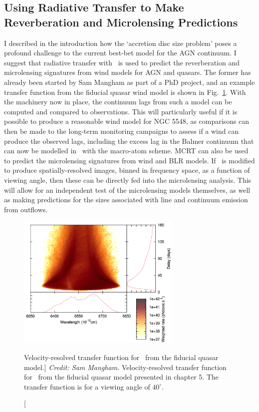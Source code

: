 \subsection{Using Radiative Transfer to Make Reverberation and Microlensing Predictions}

I described in the introduction how the `accretion disc size problem' poses
a profound challenge to the current best-bet model for the AGN continuum.
I suggest that radiative transfer with \py\ is used to predict the 
reverberation and microlensing signatures from wind models for AGN and quasars. 
The former has already been started by Sam Mangham as part of a PhD
project, and an example transfer function from the fiducial quasar wind model
is shown in Fig.~\ref{fig:halpha_transfer}. With the machinery now in place,
the continuum lags from such a model can be computed and compared to observations.
This will particularly useful if it is possible to produce a reasonable wind
model for NGC 5548, as comparisons can then be made to the long-term monitoring
campaigns \citep[e.g.][]{edelson2015} to assess if a wind can produce the observed 
lags, including the excess lag in the Balmer continuum that can now be modelled 
in \py\ with the macro-atom scheme. MCRT can also be used to predict 
the microlensing signatures from wind and BLR models. If \py\ is modified to produce
spatially-resolved images, binned in frequency space, as a function of viewing 
angle, then these can be directly fed into the microlensing analysis. This will
allow for an independent test of the microlensing models themselves, as well as
making predictions for the sizes associated with line and continuum emission from
outflows. 

\begin{figure} 
\centering
\includegraphics[width=0.7\textwidth]{figures/ewpaper/halpha_transfer.png}
\caption
[Velocity-resolved transfer function for \ha\ 
from the fiducial quasar model.]
{
{\sl Credit: Sam Mangham.}
Velocity-resolved transfer function for \ha\ 
from the fiducial quasar model presented in
chapter 5. The transfer function is for a viewing angle of 
$40^\circ$. 
}
\label{fig:halpha_transfer}
\end{figure} 

